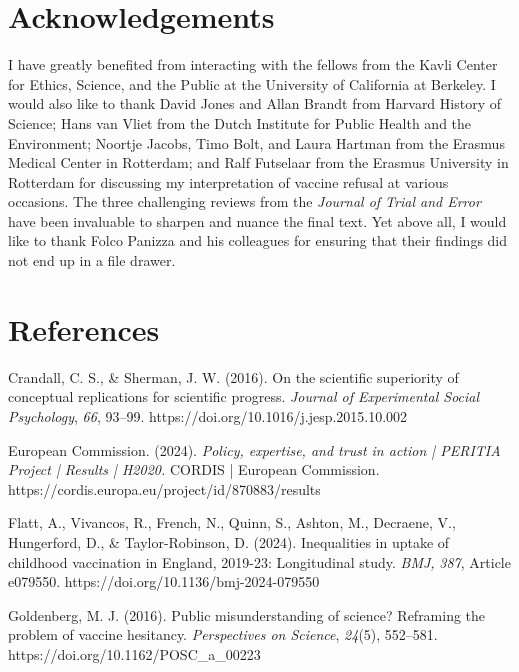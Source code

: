 \documentclass[authordate, empirical]{jote-new-article}
\begin{document}
	\section{Acknowledgements}



	I have greatly benefited from interacting with the fellows from the Kavli Center for Ethics, Science, and the Public at the University of California at Berkeley. I would also like to thank David Jones and Allan Brandt from Harvard History of Science; Hans van Vliet from the Dutch Institute for Public Health and the Environment; Noortje Jacobs, Timo Bolt, and Laura Hartman from the Erasmus Medical Center in Rotterdam; and Ralf Futselaar from the Erasmus University in Rotterdam for discussing my interpretation of vaccine refusal at various occasions. The three challenging reviews from the \emph{Journal of Trial and Error} have been invaluable to sharpen and nuance the final text. Yet above all, I would like to thank Folco Panizza and his colleagues for ensuring that their findings did not end up in a file drawer.







	\section{References}



	Crandall, C. S., \& Sherman, J. W. (2016). On the scientific superiority of conceptual replications for scientific progress. \emph{Journal of Experimental Social Psychology}, \emph{66}, 93--99. https://doi.org/10.1016/j.jesp.2015.10.002



	European Commission. (2024). \emph{Policy, expertise, and trust in action | PERITIA Project | Results | H2020. }CORDIS | European Commission. https://cordis.europa.eu/project/id/870883/results



	Flatt, A., Vivancos, R., French, N., Quinn, S., Ashton, M., Decraene, V., Hungerford, D., \& Taylor-Robinson, D. (2024). Inequalities in uptake of childhood vaccination in England, 2019-23: Longitudinal study. \emph{BMJ,} \emph{387}, Article e079550. https://doi.org/10.1136/bmj-2024-079550



	Goldenberg, M. J. (2016). Public misunderstanding of science? Reframing the problem of vaccine hesitancy. \emph{Perspectives on Science}, \emph{24}(5), 552--581. https://doi.org/10.1162/POSC\_a\_00223
\end{document}
